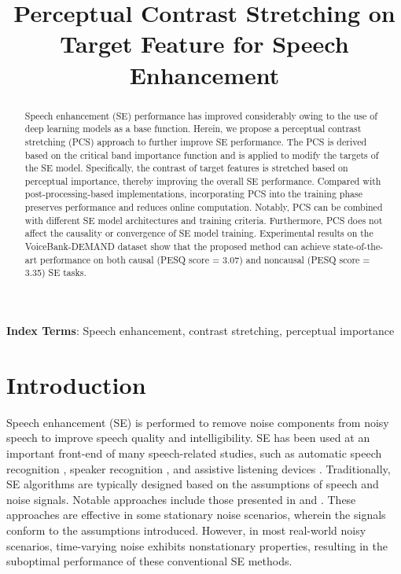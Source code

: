 \documentclass[a4paper]{article}
\title{Perceptual Contrast Stretching on Target Feature for Speech Enhancement}
\begin{document}
\maketitle


\begin{abstract}

Speech enhancement (SE) performance has improved considerably owing to the use of deep learning models as a base function. Herein, we propose a perceptual contrast stretching (PCS) approach to further improve SE performance. The PCS is derived based on the critical band importance function and is applied to modify the targets of the SE model. Specifically, the contrast of target features is stretched based on perceptual importance, thereby improving the overall SE performance. Compared with post-processing-based implementations, incorporating PCS into the training phase preserves performance and reduces online computation. Notably, PCS can be combined with different SE model architectures and training criteria. Furthermore, PCS does not affect the causality or convergence of SE model training. Experimental results on the VoiceBank-DEMAND dataset show that the proposed method can achieve state-of-the-art performance on both causal (PESQ score = 3.07) and noncausal (PESQ score = 3.35) SE tasks.


\end{abstract}
\noindent\textbf{Index Terms}: Speech enhancement, contrast stretching, perceptual importance

\section{Introduction}

Speech enhancement (SE) is performed to remove noise components from noisy speech to improve speech quality and intelligibility. SE has been used at an important front-end of many speech-related studies, such as automatic speech recognition \cite{weninger2015speech, zhang2017speech}, speaker recognition \cite{michelsanti2017conditional, taherian2020robust}, and assistive listening devices \cite{wang2017deep, lesica2021harnessing}. Traditionally, SE algorithms are typically designed based on the assumptions of speech and noise signals. Notable approaches include those presented in \cite{boll1979suppression} and \cite{priori1}. These approaches are effective in some stationary noise scenarios, wherein the signals conform to the assumptions introduced. However, in most real-world noisy scenarios, time-varying noise exhibits nonstationary properties, resulting in the suboptimal performance of these conventional SE methods. 
\end{document}
